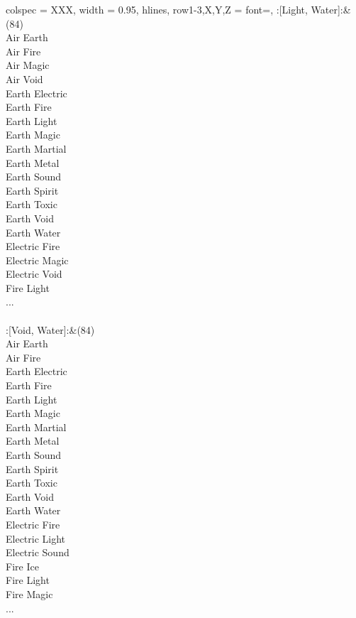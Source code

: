 \begin{longtblr}[
	caption = {2v2 Attacking Effective},
	label = {2v2-Attacking-Effective},
]{
	colspec = {XXX}, width = 0.95\linewidth,
	hlines,
	row{1-3,X,Y,Z} = {font=\bfseries},
}
	:[Light, Water]:&{(84)\\
	Air Earth \\
	Air Fire \\
	Air Magic \\
	Air Void \\
	Earth Electric \\
	Earth Fire \\
	Earth Light \\
	Earth Magic \\
	Earth Martial \\
	Earth Metal \\
	Earth Sound \\
	Earth Spirit \\
	Earth Toxic \\
	Earth Void \\
	Earth Water \\
	Electric Fire \\
	Electric Magic \\
	Electric Void \\
	Fire Light \\
	...\\
	}\\

	:[Void, Water]:&{(84)\\
	Air Earth \\
	Air Fire \\
	Earth Electric \\
	Earth Fire \\
	Earth Light \\
	Earth Magic \\
	Earth Martial \\
	Earth Metal \\
	Earth Sound \\
	Earth Spirit \\
	Earth Toxic \\
	Earth Void \\
	Earth Water \\
	Electric Fire \\
	Electric Light \\
	Electric Sound \\
	Fire Ice \\
	Fire Light \\
	Fire Magic \\
	...\\
	}\\


\end{longtblr}
